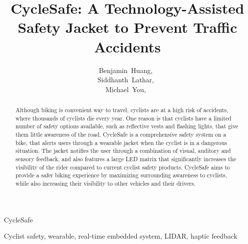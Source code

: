 \documentclass[journal]{IEEEtran}
\begin{document}
\title{CycleSafe: A Technology-Assisted \\ Safety Jacket to Prevent Traffic Accidents}

\author{
    Benjamin~Huang,~ \\
    Siddhanth~Lathar,~ \\
    Michael~You,~ \\
}

%
{CycleSafe}

\maketitle

\begin{abstract}
Although biking is convenient way to travel, cyclists are at a high risk of accidents, where thousands of cyclists die every year. One reason is that cyclists have a limited number of safety options available, such as reflective vests and flashing lights, that give them little awareness of the road. CycleSafe is a comprehensive safety system on a bike, that alerts users through a wearable jacket when the cyclist is in a dangerous situation. The jacket notifies the user through a combination of visual, auditory and sensory feedback, and also features a large LED matrix that significantly increases the visibility of the rider compared to current cyclist safety products. CycleSafe aims to provide a safer biking experience by maximizing surrounding awareness to cyclists, while also increasing their visibility to other vehicles and their drivers.
\end{abstract}

\begin{IEEEkeywords}
Cyclist safety, wearable, real-time embedded system, LIDAR, haptic feedback
\end{IEEEkeywords}
\end{document}
